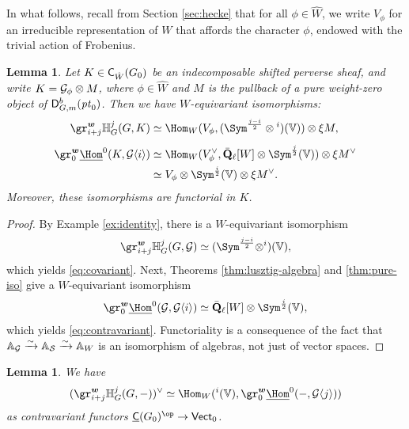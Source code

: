 \documentclass[a4paper,10pt,leqno]{amsart}
\theoremstyle{plain}
\theoremstyle{plain}
\theoremstyle{plain}
\newtheorem{lem}[thm]{Lemma}
\theoremstyle{definition}
\theoremstyle{remark}
\let\Alt\relax
\DeclareMathOperator{\Alt}{\text{$\Lambda$}}
\newcommand{\QL}{\bar{\mathbf{Q}}_\ell}
\newcommand{\point}{\mathit{pt}}
\begin{document}
In what follows, recall from Section \ref{sec:hecke} that for all $\phi \in \hat{W}$, we write $V_\phi$ for an irreducible representation of $W$ that affords the character $\phi$, endowed with the trivial action of Frobenius.

\begin{lem}\label{lem:sheaves-to-reps}
Let $K \in \sf{C}_{\hat{W}}(G_0)$ be an indecomposable shifted perverse sheaf, and write $K = \cal{G}_\phi \otimes M$, where $\phi \in \hat{W}$ and $M$ is the pullback of a pure weight-zero object of $\sf{D}_{G, m}^b(\point_0)$.
Then we have $W$-equivariant isomorphisms:
		\begin{align}
		\label{eq:covariant}		
		\gr_{i + j}^{\bm{w}} \bb{H}_G^j(G, K)
		&\simeq \Hom_W(V_\phi, {(\Sym^{\frac{j - i}{2}} \otimes {\Alt^i})}(\bb{V})) \otimes \xi M,\\[1ex]
		\label{eq:contravariant}
		\gr_0^{\bm{w}} \SHom^0(K, \cal{G}\langle i\rangle)
		&\simeq \Hom_W(V_\phi^\vee, \QL[W] \otimes \Sym^{\frac{j}{2}}(\bb{V})) \otimes \xi M^\vee\\
		&\simeq 
			V_\phi \otimes \Sym^{\frac{i}{2}}(\bb{V}) \otimes \xi M^\vee.\nonumber
		\end{align}
Moreover, these isomorphisms are functorial in $K$.
\end{lem}

\begin{proof}
By Example \ref{ex:identity}, there is a $W$-equivariant isomorphism 
\begin{align}
\gr_{i + j}^{\bm{w}} \bb{H}_G^j(G, \cal{G}) 
	\simeq {(\Sym^{\frac{j - i}{2}} \otimes \Alt^i)}(\bb{V}),
\end{align}
which yields \eqref{eq:covariant}.
Next, Theorems \ref{thm:lusztig-algebra} and \ref{thm:pure-iso} give a $W$-equivariant isomorphism
\begin{align}
\gr_0^{\bm{w}} \SHom^0(\cal{G}, \cal{G}\langle i\rangle) \simeq \QL[W] \otimes \Sym^{\frac{i}{2}}(\bb{V}),
\end{align}
which yields \eqref{eq:contravariant}.
Functoriality is a consequence of the fact that $\bb{A}_\cal{G} \xrightarrow{\sim} \bb{A}_\cal{S} \xrightarrow{\sim} \bb{A}_W$ is an isomorphism of algebras, not just of vector spaces.
\end{proof}

\begin{lem}\label{lem:h-to-g}
We have 
\begin{align}
(\gr_{i + j}^{\bm{w}} \bb{H}_G^j(G, -))^\vee
\simeq \Hom_W(\Alt^i(\bb{V}), \gr_0^{\bm{w}} {\SHom^0(-, \cal{G}\langle j\rangle)})
\end{align}
as contravariant functors $\underline{\sf{C}}(G_0)^\op \to \sf{Vect}_0$.
\end{lem}
\end{document}

